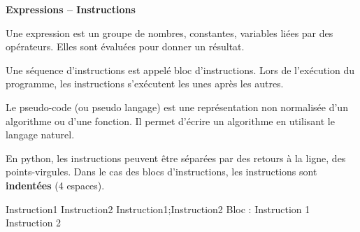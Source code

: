 \documentclass[10pt]{article}
\begin{document}
\begin{defi}
\textbf{Expressions -- Instructions}

Une expression est un groupe de nombres, constantes, variables liées par des opérateurs. Elles sont évaluées pour donner un résultat. 

Une séquence d'instructions est appelé bloc d'instructions. Lors de l'exécution du programme, les instructions s'exécutent les unes après les autres.
\end{defi}





\begin{exemple}

\begin{minipage}[c]{.47\linewidth}
Le pseudo-code (ou pseudo langage) est une représentation non normalisée d'un algorithme ou d'une fonction. Il permet d'écrire un algorithme en utilisant le langage naturel. 
\end{minipage}\hfill
\begin{minipage}[c]{.45\linewidth}
\begin{pseudo}
\begin{algorithm}[H]
\end{algorithm}
\end{pseudo}
\end{minipage}

\vspace{.25cm}

\begin{minipage}[c]{.47\linewidth}
En python, les instructions peuvent être séparées par des retours à la ligne, des points-virgules. Dans le cas des blocs d'instructions, les instructions sont \textbf{indentées} (4 espaces). 

\end{minipage}\hfill
\begin{minipage}[c]{.47\linewidth}
\begin{py}
\begin{minipage}{.9\linewidth}
\begin{python}[showspaces=true]
Instruction1
Instruction2
Instruction1;Instruction2
Bloc : 
    Instruction 1
    Instruction 2
\end{python}
\end{minipage}
\end{py}
\end{minipage}



\end{exemple}
\end{document}
